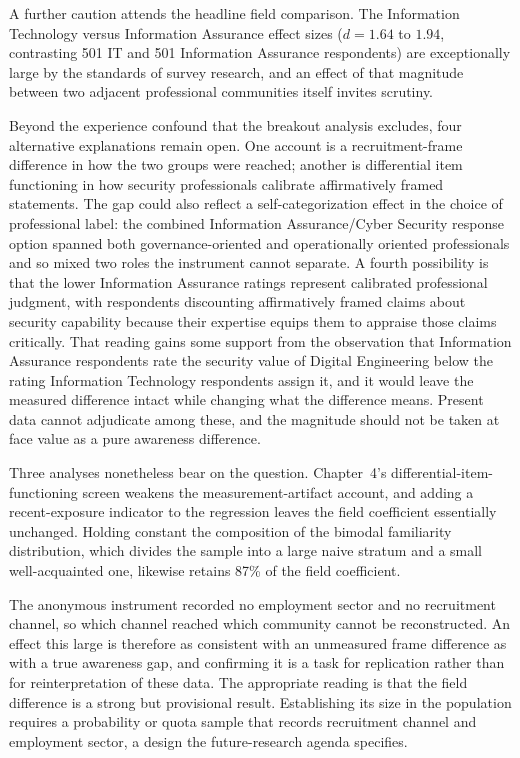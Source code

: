 A further caution attends the headline field comparison. The Information Technology versus Information Assurance effect sizes ($d=1.64$ to $1.94$, contrasting 501 IT and 501 Information Assurance respondents) are exceptionally large by the standards of survey research, and an effect of that magnitude between two adjacent professional communities itself invites scrutiny.

Beyond the experience confound that the breakout analysis excludes, four alternative explanations remain open. One account is a recruitment-frame difference in how the two groups were reached; another is differential item functioning in how security professionals calibrate affirmatively framed statements. The gap could also reflect a self-categorization effect in the choice of professional label: the combined Information Assurance/Cyber Security response option spanned both governance-oriented and operationally oriented professionals and so mixed two roles the instrument cannot separate. A fourth possibility is that the lower Information Assurance ratings represent calibrated professional judgment, with respondents discounting affirmatively framed claims about security capability because their expertise equips them to appraise those claims critically. That reading gains some support from the observation that Information Assurance respondents rate the security value of Digital Engineering below the rating Information Technology respondents assign it, and it would leave the measured difference intact while changing what the difference means. Present data cannot adjudicate among these, and the magnitude should not be taken at face value as a pure awareness difference.

Three analyses nonetheless bear on the question. Chapter~4's differential-item-functioning screen weakens the measurement-artifact account, and adding a recent-exposure indicator to the regression leaves the field coefficient essentially unchanged. Holding constant the composition of the bimodal familiarity distribution, which divides the sample into a large naive stratum and a small well-acquainted one, likewise retains 87\% of the field coefficient.

The anonymous instrument recorded no employment sector and no recruitment channel, so which channel reached which community cannot be reconstructed. An effect this large is therefore as consistent with an unmeasured frame difference as with a true awareness gap, and confirming it is a task for replication rather than for reinterpretation of these data. The appropriate reading is that the field difference is a strong but provisional result. Establishing its size in the population requires a probability or quota sample that records recruitment channel and employment sector, a design the future-research agenda specifies.

